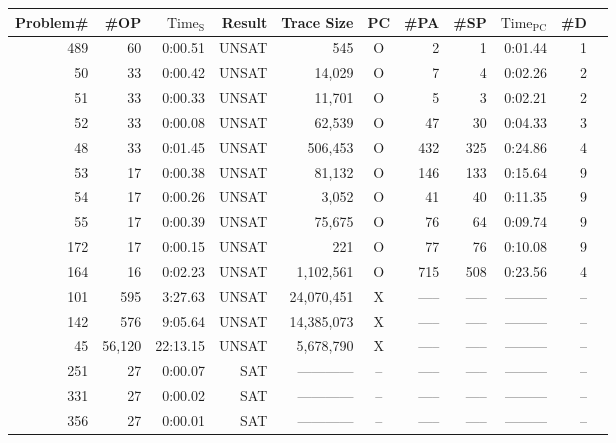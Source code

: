 \begin{table}[h]
  \begin{center}
    \begin{tabular}{|r||r|r|r||r||c|r|r|r|r|r|}
      \hline
      Problem\#&  \#OP  & $\mathrm{Time_S}$&    Result&     Trace Size& PC&  \#PA& \#SP& $\mathrm{Time_{PC}}$ & \#D\\
      \hline
      \hline
      489&       60&   0:00.51&     UNSAT&            545&O&    2&    1& 0:01.44& 1\\
      \hline
       50&       33&   0:00.42&     UNSAT&         14,029&O&    7&    4& 0:02.26& 2\\
      \hline
       51&       33&   0:00.33&     UNSAT&         11,701&O&    5&    3& 0:02.21& 2\\
      \hline
       52&       33&   0:00.08&     UNSAT&         62,539&O&   47&   30& 0:04.33& 3\\
      \hline
       48&       33&   0:01.45&     UNSAT&        506,453&O&  432&  325& 0:24.86& 4\\
      \hline
       53&       17&   0:00.38&     UNSAT&         81,132&O&  146&  133& 0:15.64& 9\\
      \hline
       54&       17&   0:00.26&     UNSAT&          3,052&O&   41&   40& 0:11.35& 9\\
      \hline
       55&       17&   0:00.39&     UNSAT&         75,675&O&   76&   64& 0:09.74& 9\\
      \hline
      172&       17&   0:00.15&     UNSAT&            221&O&   77&   76& 0:10.08& 9\\
      \hline
      164&       16&   0:02.23&     UNSAT&      1,102,561&O&  715&  508& 0:23.56& 4\\
      \hline
      101&      595&   3:27.63&     UNSAT&     24,070,451&X&  -----& -----& --------- & --\\
      \hline
      142&      576&   9:05.64&     UNSAT&     14,385,073&X&  -----& -----& --------- & --\\
      \hline
       45&   56,120&  22:13.15&     UNSAT&      5,678,790&X&  -----& -----& --------- & --\\
      \hline
      \hline
      251&       27&   0:00.07&       SAT&  ------------ &--& -----& -----& --------- & --\\
      \hline
      331&       27&   0:00.02&       SAT&  ------------ &--& -----& -----& --------- & --\\
      \hline
      356&       27&   0:00.01&       SAT&  ------------ &--& -----& -----& --------- & --\\

\end{tabular}
\end{center}
\end{table}
